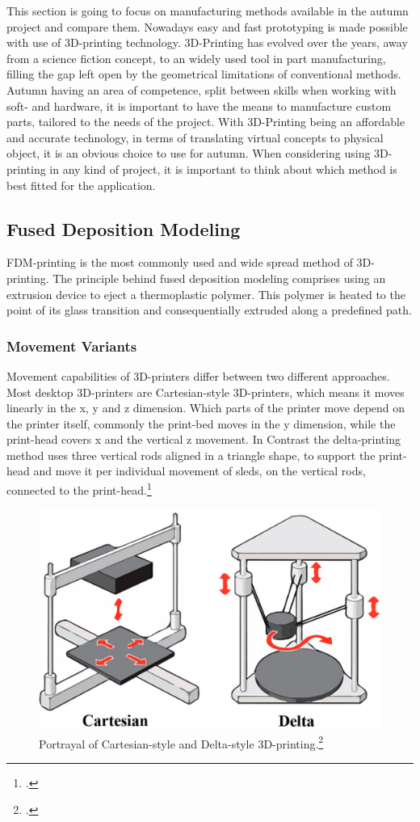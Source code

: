 This section is going to focus on manufacturing methods available in the autumn project and compare them. Nowadays easy and fast prototyping is made possible with use of 3D-printing technology. 3D-Printing has evolved over the years, away from a science fiction concept, to an widely used tool in part manufacturing, filling the gap left open by the geometrical limitations of conventional methods.\newline
Autumn having an area of competence, split between skills when working with soft- and hardware, it is important to have the means to manufacture custom parts, tailored to the needs of the project. With 3D-Printing being an affordable and accurate technology, in terms of translating virtual concepts to physical object, it is an obvious choice to use for autumn.
When considering using 3D-printing in any kind of project, it is important to think about which method is best fitted for the application.

\subsection{Fused Deposition Modeling}

FDM-printing is the most commonly used and wide spread method of 3D-printing. The principle behind fused deposition modeling comprises using an extrusion device to eject a thermoplastic polymer. This polymer is heated to the point of its glass transition and consequentially extruded along a predefined path.

\subsubsection{Movement Variants}

Movement capabilities of 3D-printers differ between two different approaches. Most desktop 3D-printers are Cartesian-style 3D-printers, which means it moves linearly in the x, y and z dimension.
Which parts of the printer move depend on the printer itself, commonly the print-bed moves in the y dimension, while the print-head covers x and the vertical z movement. In Contrast the delta-printing method uses three vertical rods aligned in a triangle shape, to support the print-head and move it per individual movement of sleds, on the vertical rods, connected to the print-head.\footcite{all3dpFDM3DPrinting2020}\newline

\begin{figure}[h]
	\centering
	\includegraphics[width=0.6\linewidth]{img/cartesianDeltaPrinting}
	\caption{Portrayal of Cartesian-style and Delta-style 3D-printing.\footcite{Schmitt2017}}
	\label{fig:custom_parts_printerMovement}
\end{figure}


